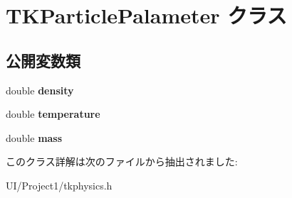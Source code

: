 \hypertarget{class_t_k_particle_palameter}{}\section{T\+K\+Particle\+Palameter クラス}
\label{class_t_k_particle_palameter}
\subsection*{公開変数類}
\begin{DoxyCompactItemize}
\item 
\mbox{\label{class_t_k_particle_palameter_a23ae16244a4143ee0642cf6620facf31}} 
double {\bfseries density}
\item 
\mbox{\label{class_t_k_particle_palameter_a65c396039f6aaf454837c2139af9da65}} 
double {\bfseries temperature}
\item 
\mbox{\label{class_t_k_particle_palameter_a9be89d1ba1cb6c97e6154bf9f91f2437}} 
double {\bfseries mass}
\end{DoxyCompactItemize}


このクラス詳解は次のファイルから抽出されました\+:\begin{DoxyCompactItemize}
\item 
U\+I/\+Project1/tkphysics.\+h\end{DoxyCompactItemize}
